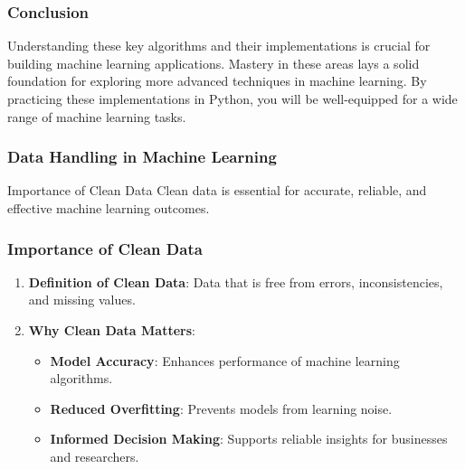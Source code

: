 \documentclass[aspectratio=169]{beamer}
\begin{document}
\begin{frame}
    \frametitle{Conclusion}
    Understanding these key algorithms and their implementations is crucial for building machine learning applications. Mastery in these areas lays a solid foundation for exploring more advanced techniques in machine learning. By practicing these implementations in Python, you will be well-equipped for a wide range of machine learning tasks.
\end{frame}

\begin{frame}[fragile]
    \frametitle{Data Handling in Machine Learning}
    \begin{block}{Importance of Clean Data}
        Clean data is essential for accurate, reliable, and effective machine learning outcomes.
    \end{block}
\end{frame}

\begin{frame}[fragile]
    \frametitle{Importance of Clean Data}
    \begin{enumerate}
        \item \textbf{Definition of Clean Data}: Data that is free from errors, inconsistencies, and missing values.
        \item \textbf{Why Clean Data Matters}:
        \begin{itemize}
            \item \textbf{Model Accuracy}: Enhances performance of machine learning algorithms.
            \item \textbf{Reduced Overfitting}: Prevents models from learning noise.
            \item \textbf{Informed Decision Making}: Supports reliable insights for businesses and researchers.
        \end{itemize}
    \end{enumerate}
\end{frame}
\end{document}
